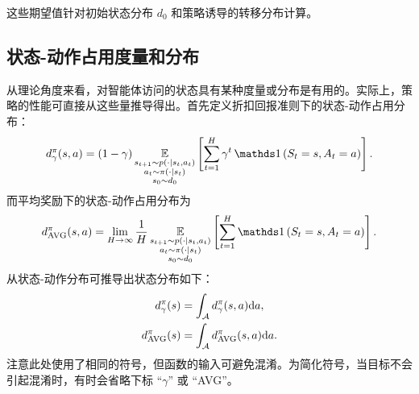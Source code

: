 这些期望值针对初始状态分布 $d_0$ 和策略诱导的转移分布计算。

\subsection{状态-动作占用度量和分布}
\label{subsec:def_state_distrib}

从理论角度来看，对智能体访问的状态具有某种度量或分布是有用的。实际上，策略的性能可直接从这些量推导得出。首先定义折扣回报准则下的状态-动作占用分布：
\begin{align}
\label{def:discounted_state_distrib}
    \discountedstateoccupancydistribution[\gamma] (s,a)= (1-\gamma)\expectedvalue_{\substack{s_{t+1}\sim p(\cdot\vert s_t,a_t)\\a_t\sim\pi(\cdot\vert s_t)\\s_0\sim \initialstatedistribution}}\left[\sum_{t=1}^H \gamma^t \Ind\left(S_t=s, A_t=a\right)\right].
\end{align}
而平均奖励下的状态-动作占用分布为
\begin{align*}
    \averagestateoccupancydistribution (s,a)= \lim_{H\rightarrow \infty}\frac{1}{H}\expectedvalue_{\substack{s_{t+1}\sim p(\cdot\vert s_t,a_t)\\a_t\sim\pi(\cdot\vert s_t)\\s_0\sim \initialstatedistribution}}\left[\sum_{t=1}^H \Ind\left(S_t=s, A_t=a\right)\right].
\end{align*}
从状态-动作分布可推导出状态分布如下：
\begin{align*}
    \discountedstateoccupancydistribution[\gamma] (s)&=\int_\actionspace \discountedstateoccupancydistribution[\gamma] (s,a) \de a,
    \\
    \averagestateoccupancydistribution (s) &= \int_\actionspace\averagestateoccupancydistribution (s,a)\de a.
\end{align*}
注意此处使用了相同的符号，但函数的输入可避免混淆。为简化符号，当目标不会引起混淆时，有时会省略下标 ``$\gamma$'' 或 ``AVG''。

